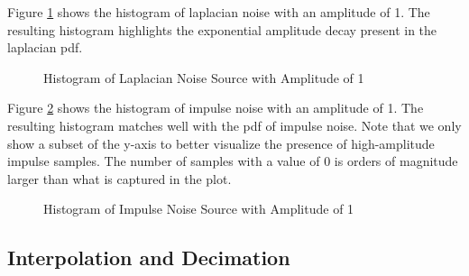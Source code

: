 \documentclass{article}
\begin{document}
Figure \ref{fig::laplacian_noise_histogram} shows the histogram of laplacian noise with an amplitude of 1. The resulting histogram highlights the exponential amplitude decay present in the laplacian pdf.

\begin{figure}[H]
	\centerline{}
	\caption{Histogram of Laplacian Noise Source with Amplitude of 1}
	\label{fig::laplacian_noise_histogram}
\end{figure}

Figure \ref{fig::impulse_noise_histogram} shows the histogram of impulse noise with an amplitude of 1. The resulting histogram matches well with the pdf of impulse noise. Note that we only show a subset of the y-axis to better visualize the presence of high-amplitude impulse samples. The number of samples with a value of 0 is orders of magnitude larger than what is captured in the plot. 

\begin{figure}[H]
	\centerline{}
	\caption{Histogram of Impulse Noise Source with Amplitude of 1}
	\label{fig::impulse_noise_histogram}
\end{figure}

\subsection{Interpolation and Decimation}
\end{document}
